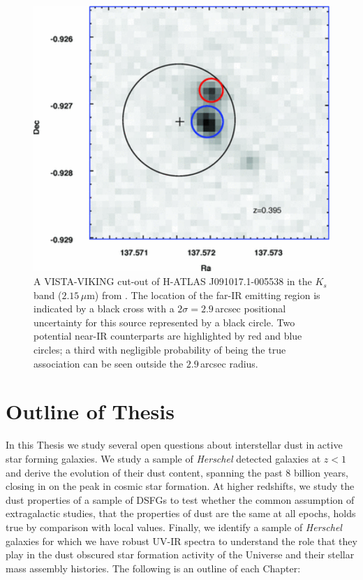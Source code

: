 \begin{figure}
    \centering
	\includegraphics[width=0.8\columnwidth]{Figures/viking_cutout.pdf}
	\caption[VISTA-VIKING cut-out of H-ATLAS J091017.1-005538]{A VISTA-VIKING cut-out of H-ATLAS J091017.1-005538 in the $K_s$ band ($2.15\,\mu$m) from \citealt{Fleuren_2012}. The location of the far-IR emitting region is indicated by a black cross with a $2\sigma = 2.9\,$arcsec positional uncertainty for this source represented by a black circle. Two potential near-IR counterparts are highlighted by red and blue circles; a third with negligible probability of being the true association can be seen outside the $2.9\,$arcsec radius.}
	\label{fig:viking_cutout}
\end{figure}

\section{Outline of Thesis}

In this Thesis we study several open questions about interstellar dust in active star forming galaxies. We study a sample of \textit{Herschel} detected galaxies at $z < 1$ and derive the evolution of their dust content, spanning the past $8$ billion years, closing in on the peak in cosmic star formation. At higher redshifts, we study the dust properties of a sample of DSFGs to test whether the common assumption of extragalactic studies, that the properties of dust are the same at all epochs, holds true by comparison with local values. Finally, we identify a sample of \textit{Herschel} galaxies for which we have robust UV-IR spectra to understand the role that they play in the dust obscured star formation activity of the Universe and their stellar mass assembly histories. The following is an outline of each Chapter:

